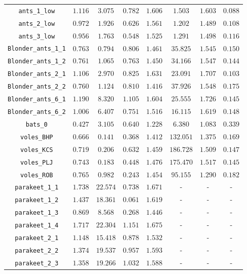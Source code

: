 \documentclass[twocolumn,8pt]{article}
\begin{document}
\begin{table}[p]
\begin{tabular}{c|ccccccc}
\verb|ants_1_low| & $1.116$ & $3.075$ & $0.782$ & $1.606$ & $1.503$ & $1.603$ & $0.088$\\
\verb|ants_2_low| & $0.972$ & $1.926$ & $0.626$ & $1.561$ & $1.202$ & $1.489$ & $0.108$\\
\verb|ants_3_low| & $0.956$ & $1.763$ & $0.548$ & $1.525$ & $1.291$ & $1.498$ & $0.116$\\
\verb|Blonder_ants_1_1| & $0.763$ & $0.794$ & $0.806$ & $1.461$ & $35.825$ & $1.545$ & $0.150$\\
\verb|Blonder_ants_1_2| & $0.761$ & $1.065$ & $0.763$ & $1.450$ & $34.166$ & $1.547$ & $0.144$\\
\verb|Blonder_ants_2_1| & $1.106$ & $2.970$ & $0.825$ & $1.631$ & $23.091$ & $1.707$ & $0.103$\\
\verb|Blonder_ants_2_2| & $0.760$ & $1.124$ & $0.810$ & $1.416$ & $37.926$ & $1.548$ & $0.175$\\
\verb|Blonder_ants_6_1| & $1.190$ & $8.320$ & $1.105$ & $1.604$ & $25.555$ & $1.726$ & $0.145$\\
\verb|Blonder_ants_6_2| & $1.006$ & $6.407$ & $0.751$ & $1.516$ & $16.115$ & $1.619$ & $0.148$\\
\verb|bats_0| & $0.427$ & $3.105$ & $0.640$ & $1.228$ & $6.380$ & $1.083$ & $0.339$\\
\verb|voles_BHP| & $0.666$ & $0.141$ & $0.368$ & $1.412$ & $132.051$ & $1.375$ & $0.169$\\
\verb|voles_KCS| & $0.719$ & $0.206$ & $0.632$ & $1.459$ & $186.728$ & $1.509$ & $0.147$\\
\verb|voles_PLJ| & $0.743$ & $0.183$ & $0.448$ & $1.476$ & $175.470$ & $1.517$ & $0.145$\\
\verb|voles_ROB| & $0.765$ & $0.982$ & $0.243$ & $1.454$ & $95.155$ & $1.290$ & $0.182$\\
\verb|parakeet_1_1| & $1.738$ & $22.574$ & $0.738$ & $1.671$ & - & - & - \\
\verb|parakeet_1_2| & $1.437$ & $18.361$ & $0.061$ & $1.619$ & - & - & - \\
\verb|parakeet_1_3| & $0.869$ & $8.568$ & $0.268$ & $1.446$ & - & - & - \\
\verb|parakeet_1_4| & $1.717$ & $22.304$ & $1.151$ & $1.675$ & - & - & - \\
\verb|parakeet_2_1| & $1.148$ & $15.418$ & $0.878$ & $1.532$ & - & - & - \\
\verb|parakeet_2_2| & $1.374$ & $19.537$ & $0.957$ & $1.593$ & - & - & - \\
\verb|parakeet_2_3| & $1.358$ & $19.266$ & $1.032$ & $1.588$ & - & - & - \\

\end{tabular}
\end{table}
\end{document}
